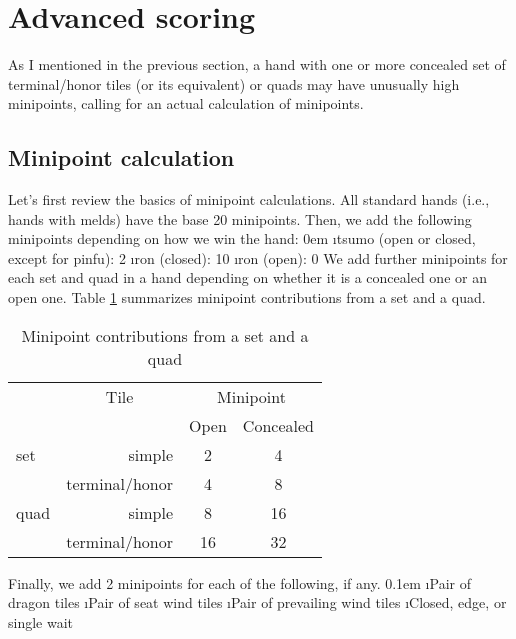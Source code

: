 \newpage

\section{Advanced scoring} \label{sec:scores2}

As I mentioned in the previous section, a hand with one or more concealed set of terminal/honor tiles (or its equivalent) or quads may have unusually high minipoints, calling for an actual calculation of minipoints.

\subsection{Minipoint calculation}
	 
Let's first review the basics of minipoint calculations.
All standard hands (i.e., hands with melds) have the base 20 minipoints. Then, we add the following minipoints depending on how we win the hand:
\bi \itemsep0em
\i {\jap tsumo} (open or closed, except for {\jap pinfu}): 2
\i {\jap ron} (closed): 10
\i {\jap ron} (open): 0
\ei
We add further minipoints for each set and quad in a hand depending on whether it is a concealed one or an open one. Table \ref{tbl:minip_set} summarizes minipoint contributions from a set and a quad.
{\begin{table}[h!]\centering\small\captionsetup{font=small}
\caption{Minipoint contributions from a set and a quad} \label{tbl:minip_set}
\begin{tabular}{l r c c}
\toprule
& \multicolumn{1}{c}{Tile} & \multicolumn{2}{c}{Minipoint}\\
&  & {\footnotesize Open} & {\footnotesize Concealed}\\
\midrule
set	& simple & 2 & 4\\
	& terminal/honor & 4 & 8\\
\midrule
quad	 & simple & 8 & 16\\
	& terminal/honor & 16 & 32\\
\bottomrule
\end{tabular}
\end{table}}

\newpage
\noindent Finally, we add 2 minipoints for each of the following, if any.
\bi \itemsep0.1em
\i Pair of dragon tiles
\i Pair of seat wind tiles
\i Pair of prevailing wind tiles
\i Closed, edge, or single wait
\ei

